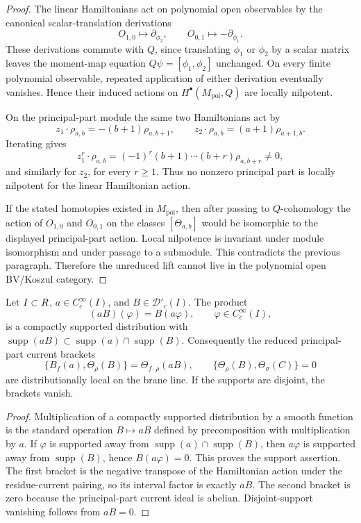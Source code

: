 \begin{proof}
  The linear Hamiltonians act on polynomial open observables by the
  canonical scalar-translation derivations
  \[
    O_{1,0}\mapsto \partial_{\phi_2},\qquad
    O_{0,1}\mapsto -\partial_{\phi_1}.
  \]
  These derivations commute with \(Q\), since translating
  \(\phi_1\) or \(\phi_2\) by a scalar matrix leaves the moment-map
  equation \(Q\psi=[\phi_1,\phi_2]\) unchanged. On every finite
  polynomial observable, repeated application of either derivation
  eventually vanishes. Hence their induced actions on
  \(H^\bullet(M_{\mathrm{pol}},Q)\) are locally nilpotent.

  On the principal-part module the same two Hamiltonians act by
  \[
    z_1\cdot\rho_{a,b}=-(b+1)\rho_{a,b+1},\qquad
    z_2\cdot\rho_{a,b}=(a+1)\rho_{a+1,b}.
  \]
  Iterating gives
  \[
    z_1^r\cdot\rho_{a,b}
      =(-1)^r(b+1)\cdots(b+r)\rho_{a,b+r}\neq0,
  \]
  and similarly for \(z_2\), for every \(r\geq1\).  Thus no nonzero
  principal part is locally nilpotent for the linear Hamiltonian action.

  If the stated homotopies existed in \(M_{\mathrm{pol}}\), then after
  passing to \(Q\)-cohomology the action of \(O_{1,0}\) and \(O_{0,1}\)
  on the classes \([\Theta_{a,b}]\) would be isomorphic to the displayed
  principal-part action.  Local nilpotence is invariant under module
  isomorphism and under passage to a submodule. This contradicts the
  previous paragraph. Therefore the unreduced lift cannot live in the
  polynomial open BV/Koszul category.
\end{proof}

\begin{lem}
\label{lem:app-distributional-locality-principal-parts}
  Let \(I\subset R\), \(a\in C^\infty_c(I)\), and
  \(B\in\mathcal D'_c(I)\).  The product
  \[
    (aB)(\varphi)=B(a\varphi),\qquad \varphi\in C^\infty_c(I),
  \]
  is a compactly supported distribution with
  \(\operatorname{supp}(aB)\subset
  \operatorname{supp}(a)\cap\operatorname{supp}(B)\).  Consequently the
  reduced principal-part current brackets
  \[
    \{B_f(a),\Theta_\rho(B)\}
      =\Theta_{f\cdot\rho}(aB),\qquad
    \{\Theta_\rho(B),\Theta_\sigma(C)\}=0
  \]
  are distributionally local on the brane line.  If the supports are
  disjoint, the brackets vanish.
\end{lem}

\begin{proof}
  Multiplication of a compactly supported distribution by a smooth
  function is the standard operation \(B\mapsto aB\) defined by
  precomposition with multiplication by \(a\).  If
  \(\varphi\) is supported away from
  \(\operatorname{supp}(a)\cap\operatorname{supp}(B)\), then
  \(a\varphi\) is supported away from \(\operatorname{supp}(B)\), hence
  \(B(a\varphi)=0\).  This proves the support assertion.  The first
  bracket is the negative transpose of the Hamiltonian action under the
  residue-current pairing, so its interval factor is exactly \(aB\).
  The second bracket is zero because the principal-part current ideal is
  abelian.  Disjoint-support vanishing follows from \(aB=0\).
\end{proof}

